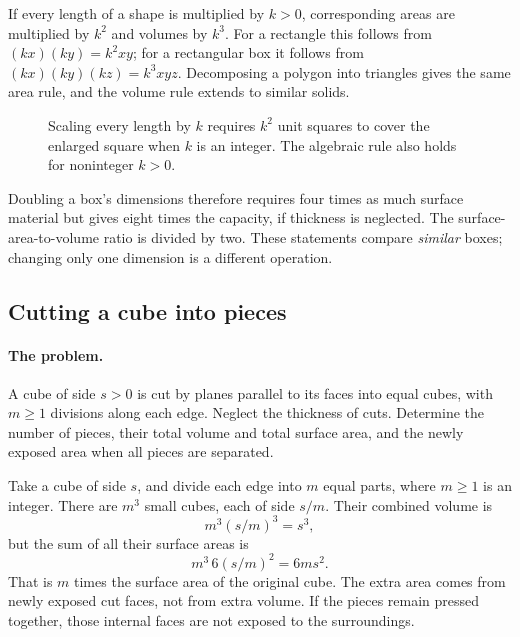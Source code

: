 If every length of a shape is multiplied by $k>0$, corresponding areas
are multiplied by $k^2$ and volumes by $k^3$. For a rectangle this follows
from $(kx)(ky)=k^2xy$; for a rectangular box it follows from
$(kx)(ky)(kz)=k^3xyz$. Decomposing a polygon into triangles gives the
same area rule, and the volume rule extends to similar solids.

\begin{figure}[htbp]\centering
{}
\caption{Scaling every length by $k$ requires $k^2$ unit squares to cover the enlarged square when $k$ is an integer. The algebraic rule also holds for noninteger $k>0$.}
\end{figure}

Doubling a box's dimensions therefore requires four times as much surface
material but gives eight times the capacity, if thickness is neglected.
The surface-area-to-volume ratio is divided by two. These statements
compare \emph{similar} boxes; changing only one dimension is a different
operation.

\subsection{Cutting a cube into pieces}
\paragraph{The problem.}
A cube of side $s>0$ is cut by planes parallel to its faces into equal
cubes, with $m\geq1$ divisions along each edge. Neglect the thickness of
cuts. Determine the number of pieces, their total volume and total surface
area, and the newly exposed area when all pieces are separated.

Take a cube of side $s$, and divide each edge into $m$ equal parts, where
$m\geq1$ is an integer. There are $m^3$ small cubes, each of side $s/m$.
Their combined volume is
\[
m^3(s/m)^3=s^3,
\]
but the sum of all their surface areas is
\[
m^3\,6(s/m)^2=6ms^2.
\]
That is $m$ times the surface area of the original cube. The extra area
comes from newly exposed cut faces, not from extra volume. If the pieces
remain pressed together, those internal faces are not exposed to the surroundings.

